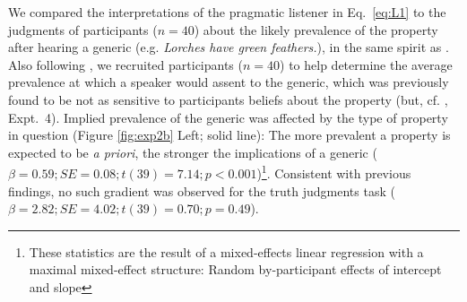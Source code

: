 \documentclass[10pt,letterpaper]{article}
\begin{document}
We compared the interpretations of the pragmatic listener in Eq.~\ref{eq:L1} to the judgments of participants ($n=40$) about the likely prevalence of the property after hearing a generic (e.g. \emph{Lorches have green feathers.}), in the same spirit as . 
Also following , we recruited participants ($n=40$) to help determine the average prevalence at which a speaker would assent to the generic, which was previously found to be not as sensitive to participants beliefs about the property (but, cf. , Expt.~4).
Implied prevalence of the generic was affected by the type of property in question (Figure \ref{fig:exp2b} Left; solid line): The more prevalent a property is expected to be \emph{a priori}, the stronger the implications of a generic ($\beta = 0.59; SE = 0.08; t(39) = 7.14; p < 0.001$)\footnote{These statistics are the result of a mixed-effects linear regression with a maximal mixed-effect structure: Random by-participant effects of intercept and slope}. 
Consistent with previous findings, no such gradient was observed for the truth judgments task ($\beta = 2.82; SE = 4.02; t(39) = 0.70; p = 0.49$).

\end{document}
